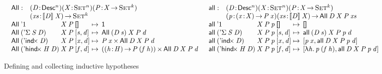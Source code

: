 \begin{figure*}

\[
\begin{array}{ll}
\stk{
\begin{array}{@{}ll}
\SYMBAll : & \PITEL{\V{D}}{\Desc^n}
             \PITEL{\V{X}}{\Set^n}
             \PITEL{\V{P}}{\V{X} \To \Set^k} \\
           & \PI{\V{xs}}{\descop{\V{D}}{\V{X}}} 
             \Set^k 
\end{array} \\
\begin{array}{@{}l@{}l@{\:\mapsto\:\:}l}
\All{\DUnit}{& \V{X}}{\V{P}}{\Void} &
    \Unit \\
\All{(\DSigma{\V{S}}{\V{D}})}{& \V{X}}{\V{P}}{\pair{\V{s}}{\V{d}}{}} &
    \All{(\V{D}\: \V{s})}{\V{X}}{\V{P}}{\V{d}} \\
\All{(\DIndx{\V{D}})}{& \V{X}}{\V{P}}{\pair{\V{x}}{\V{d}}{}} &
    \TIMES{\V{P}\: \V{x}}{\All{\V{D}}{\V{X}}{\V{P}}{\V{d}}} \\
\All{(\DHindx{\V{H}}{\V{D}})}{& \V{X}}{\V{P}}{\pair{\V{f}}{\V{d}}{}} &
    \TIMES{(\PI{\V{h}}{\V{H}} \V{P}\: (\V{f}\: \V{h}))}
          {\All{\V{D}}{\V{X}}{\V{P}}{\V{d}}}
\end{array}
}
&
\stk{
\begin{array}{@{}ll}
\SYMBall : & \PITEL{\V{D}}{\Desc^n}
             \PITEL{\V{X}}{\Set^n}
             \PITEL{\V{P}}{\V{X} \To \Set^k} \\
           & \PITEL{\V{p}}{\PI{\V{x}}{\V{X}} \V{P}\: \V{x}}
             \PI{\V{xs}}{\descop{\V{D}}{\V{X}}} 
             \All{\V{D}}{\V{X}}{\V{P}}{\V{xs}} 
\end{array} \\
\begin{array}{@{}l@{}l@{\:\mapsto\:\:}l}
\all{\DUnit}{& \V{X}}{\V{P}}{\V{p}}{\Void} &
    \Void \\
\all{(\DSigma{\V{S}}{\V{D}})}{& \V{X}}{\V{P}}{\V{p}}{\pair{\V{s}}{\V{d}}{}} &
    \all{(\V{D}\: \V{s})}{\V{X}}{\V{P}}{\V{p}}{\V{d}} \\
\all{(\DIndx{\V{D}})}{& \V{X}}{\V{P}}{\V{p}}{\pair{\V{x}}{\V{d}}{}} &
    \pair{\V{p}\: \V{x}}
         {\all{\V{D}}{\V{X}}{\V{P}}{\V{p}}{\V{d}}}{} \\
\all{(\DHindx{\V{H}}{\V{D}})}{& \V{X}}{\V{P}}{\V{p}}{\pair{\V{f}}{\V{d}}{}} &
    \pair{\LAM{\V{h}} \V{p}\: (\V{f}\: \V{h})}
         {\all{\V{D}}{\V{X}}{\V{P}}{\V{p}}{\V{d}}}{}
\end{array}
\end{array}
}
\]

\caption{Defining and collecting inductive hypotheses}
\label{fig:all-predicates}

\end{figure*}


